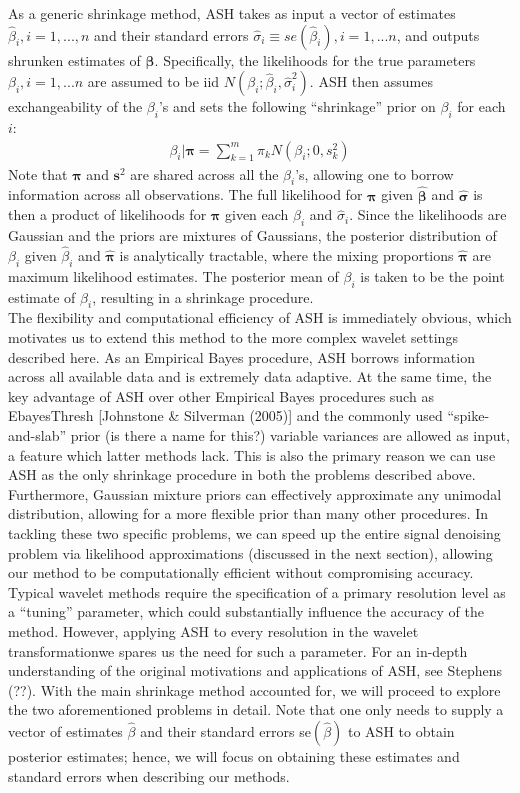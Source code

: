 \documentclass[12pt]{article}
\newcommand{\Gb}{\beta}
\newcommand{\s}{\sigma}
\begin{document}
As a generic shrinkage method, ASH takes as input a vector of estimates $\hat{\Gb}_i,i=1,...,n$ and their standard errors $\hat{\s}_i\equiv se(\hat{\Gb}_i),i=1,...n$, and outputs shrunken estimates of $\bm{\Gb}$. Specifically, the likelihoods for the true parameters $\Gb_i,i=1,...n$ are assumed to be iid $N(\Gb_i;\hat{\Gb}_i,\hat{\s}_i^2)$. ASH then assumes exchangeability of the $\Gb_i$'s and sets the following ``shrinkage'' prior on $\Gb_i$ for each $i$:
\begin{eqnarray}
\Gb_i|\bm{\pi}=\sum_{k=1}^m \pi_k N(\Gb_i;0,s_k^2)
\end{eqnarray}
Note that $\bm{\pi}$ and $\bm{s}^2$ are shared across all the $\Gb_i$'s, allowing one to borrow information across all observations. The full likelihood for $\bm{\pi}$ given $\bm{\hat{\Gb}}$ and $\bm{\hat{\s}}$ is then a product of likelihoods for $\bm{\pi}$ given each $\hat{\Gb}_i$ and $\hat{\s}_i$. Since the likelihoods are Gaussian and the priors are mixtures of Gaussians, the posterior distribution of $\Gb_i$ given $\hat{\Gb}_i$ and $\bm{\hat{\pi}}$ is analytically tractable, where the mixing proportions $\bm{\hat{\pi}}$ are maximum likelihood estimates. The posterior mean of $\Gb_i$ is taken to be the point estimate of $\Gb_i$, resulting in a shrinkage procedure.\bigskip\\
The flexibility and computational efficiency of ASH is immediately obvious, which motivates us to extend this method to the more complex wavelet settings described here. As an Empirical Bayes procedure, ASH borrows information across all available data and is extremely data adaptive. At the same time, the key advantage of ASH over other Empirical Bayes procedures such as EbayesThresh [Johnstone \& Silverman (2005)] and the commonly used ``spike-and-slab'' prior (is there a name for this?) variable variances are allowed as input, a feature which latter methods lack. This is also the primary reason we can use ASH as the only shrinkage procedure in both the problems described above. Furthermore, Gaussian mixture priors can effectively approximate any unimodal distribution, allowing for a more flexible prior than many other procedures. In tackling these two specific problems, we can speed up the entire signal denoising problem via likelihood approximations (discussed in the next section), allowing our method to be computationally efficient without compromising accuracy. Typical wavelet methods require the specification of a primary resolution level as a ``tuning'' parameter, which could substantially influence the accuracy of the method. However, applying ASH to every resolution in the wavelet transformationwe spares us the need for such a parameter. For an in-depth understanding of the original motivations and applications of ASH, see Stephens (??). With the main shrinkage method accounted for, we will proceed to explore the two aforementioned problems in detail. Note that one only needs to supply a vector of estimates $\hat{\Gb}$ and their standard errors se$(\hat{\Gb})$ to ASH to obtain posterior estimates; hence, we will focus on obtaining these estimates and standard errors when describing our methods.
\end{document}
